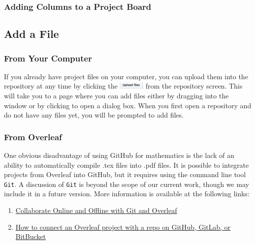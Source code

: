 \documentclass[11pt]{article}
\begin{document}
\subsubsection{Adding Columns to a Project Board}



\subsection{Add a File}

\subsubsection{From Your Computer} 

If you already have project files on your computer, you can upload them into the repository at any time by clicking the \includegraphics[width=0.5in]{UploadFilesbutton} from the repository screen. This will take you to a page where you can add files either by dragging into the window or by clicking to open a dialog box. When you first open a repository and do not have any files yet, you will be prompted to add files. 

\subsubsection{From Overleaf}

One obvious disadvantage of using GitHub for mathematics is the lack of an ability to automatically compile .tex files into .pdf files. 
It is possible to integrate projects from Overleaf into GitHub, but it requires using the command line tool \texttt{Git}. A discussion of \texttt{Git} is beyond the scope of our current work, though we may include it in a future version. More information is available at the following links: \\

\begin{enumerate}
\item \href{https://www.overleaf.com/blog/195-new-collaborate-online-and-offline-with-overleaf-and-git-beta#.Wx6qPI5r06Y}{Collaborate Online and Offline with Git and Overleaf}
\item \href{https://www.overleaf.com/help/233-how-do-i-connect-an-overleaf-project-with-a-repo-on-github#.Wx6qfY5r06Y}{ How to connect an Overleaf project with a repo on GitHub, GitLab, or BitBucket}
\end{enumerate}
\end{document}
